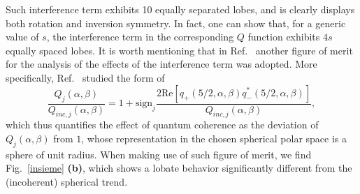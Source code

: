 Such interference term exhibits 10 equally separated lobes, and is clearly displays both rotation and inversion symmetry. In fact, one can show that, for a generic value of $s$, the interference term in the corresponding $Q$ function exhibits $4s$ equally spaced lobes. It is worth mentioning that in Ref.~\cite{agarwalCAT1997} another figure of merit for the analysis of the effects of the interference term was adopted. More specifically, Ref.~\cite{agarwalCAT1997} studied the form of 
\begin{equation}
\frac{Q_j(\alpha,\beta)}{Q_{inc,j}(\alpha,\beta)}=1+\text{sign}_j\frac{2\text{Re}[q_+(5/2,\alpha,\beta)q^*_-(5/2,\alpha,\beta)]}{Q_{inc,j}(\alpha,\beta)},
\end{equation}
which thus quantifies the effect of quantum coherence as the deviation of $Q_j(\alpha,\beta)$ from $1$, whose representation in the chosen spherical polar space is a sphere of unit radius. When making use of such figure of merit, we find Fig.~\ref{insieme} {\bf (b)}, which shows a lobate behavior significantly different from the (incoherent) spherical trend. 
